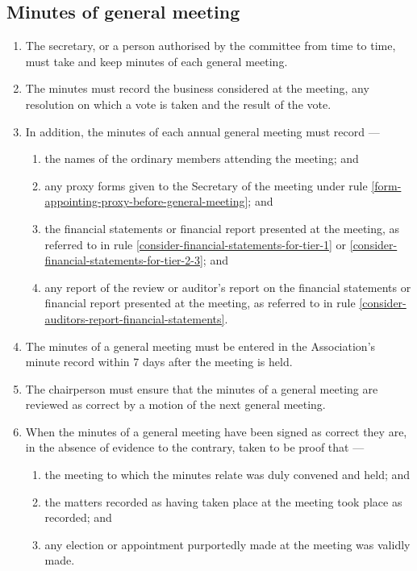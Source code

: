 \documentclass[../constitution.tex]{subfiles}
\begin{document}
\hypertarget{minutes-of-general-meeting}{%
\subsection{Minutes of general meeting}\label{minutes-of-general-meeting}}

\begin{enumerate}

\item The secretary, or a person authorised by the committee from time to time, must take and keep minutes of each general meeting.
\item The minutes must record the business considered at the meeting, any resolution on which a vote is taken and the result of the vote.
\item In addition, the minutes of each annual general meeting must record ---

  \begin{enumerate}
  
  \item the names of the ordinary members attending the meeting; and
  \item any proxy forms given to the Secretary of the meeting under rule \ref{form-appointing-proxy-before-general-meeting}; and
  \item the financial statements or financial report presented at the meeting, as referred to in rule \ref{consider-financial-statements-for-tier-1} or \ref{consider-financial-statements-for-tier-2-3}; and
  \item any report of the review or auditor's report on the financial statements or financial report presented at the meeting, as referred to in rule \ref{consider-auditors-report-financial-statements}.
  \end{enumerate}
\item The minutes of a general meeting must be entered in the Association's minute record within 7 days after the meeting is held.
\item The chairperson must ensure that the minutes of a general meeting are reviewed as correct by a motion of the next general meeting.
\item When the minutes of a general meeting have been signed as correct they are, in the absence of evidence to the contrary, taken to be proof that ---

  \begin{enumerate}
  
  \item the meeting to which the minutes relate was duly convened and held; and
  \item the matters recorded as having taken place at the meeting took place as recorded; and
  \item any election or appointment purportedly made at the meeting was validly made.
  \end{enumerate}
\end{enumerate}
\end{document}
